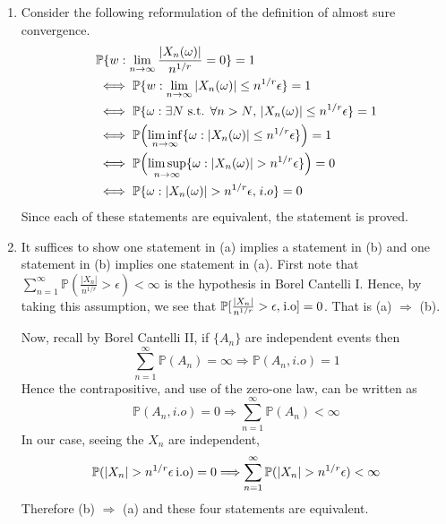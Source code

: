 \documentclass[12pt]{article}  %
\newcommand{\e}{{\epsilon}}
\newcommand{\prob}{{\mathbb{P}}}
\begin{document}
\begin{enumerate}
\begin{enumerate}
\item Consider the following reformulation of the definition of almost sure convergence. 
\begin{align*}
&\prob\{w:\lim_{n\to\infty}\frac{|X_n(\omega)|}{n^{1/r}} = 0\} = 1\\ 
&\iff\prob\{w:\lim_{n\to\infty}|X_n(\omega)|\leq n^{1/r}\e\} = 1\\
&\iff \prob\{\omega:\exists \text{$N$ s.t. $\forall n>N$, $|X_n(\omega)|\leq n^{1/r}\e$}\} = 1\\
&\iff \prob\Big(\underset{n\to\infty}{\lim\inf}\{\omega: |X_n(\omega)|\leq n^{1/r}\e\}\Big) = 1\\
&\iff \prob\Big(\underset{n\to\infty}{\lim\sup}\{\omega: |X_n(\omega)|> n^{1/r}\e\}\Big) = 0\\
&\iff \prob\{\omega: |X_n(\omega)|> n^{1/r}\e,\hspace{.1em}i.o\} = 0\\
\end{align*}
Since each of these statements are equivalent, the statement is proved. 

\item It suffices to show one statement in (a) implies a statement in (b) and one statement in (b) implies one statement in (a). First note that $\sum_{n=1}^{\infty}\prob(\frac{|X_n|}{n^{1/r}}>\e)<\infty$ is the hypothesis in Borel Cantelli I. Hence, by taking this assumption, we see that $\prob[\frac{|X_n|}{n^{1/r}}>\e,\hspace{.1em}\text{i.o}] = 0$. That is (a) $\Longrightarrow$ (b). 
 
Now, recall by Borel Cantelli II, if $\{A_n\}$ are independent events then $$\sum_{n = 1}^{\infty}\prob(A_n)=\infty\Longrightarrow\prob(A_n, i.o) = 1$$ Hence the contrapositive, and use of the zero-one law, can be written as $$\prob(A_n, i.o) = 0\Longrightarrow\sum_{n = 1}^{\infty}\prob(A_n)<\infty$$ In our case, seeing the $X_n$ are independent, $$\prob(|X_n|>n^{1/r}\e\hspace{0.2em}\text{i.o}) = 0\Longrightarrow \sum_{n = 1}^{\infty}\prob(|X_n|>n^{1/r}\e)<\infty$$ Therefore (b) $\Longrightarrow$ (a) and these four statements are equivalent. 

\end{enumerate}


\end{enumerate}
\end{document}
